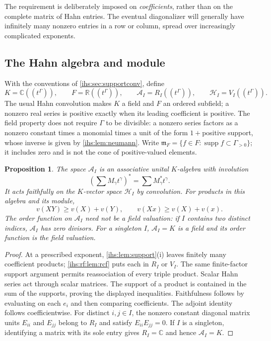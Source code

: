 \documentclass[11pt,a4paper]{article}
\numberwithin{equation}{section}
\newtheorem{proposition}[proposition]{Proposition}
\theoremstyle{definition}
\theoremstyle{remark}
\newcommand{\C}{\mathbb C}
\newcommand{\R}{\mathbb R}
\newcommand{\K}{K}
\newcommand{\Fld}{F}
\newcommand{\mF}{\mathfrak m_F}
\newcommand{\Hrf}{\mathcal H_I}
\newcommand{\Arf}{\mathcal A_I}
\newcommand{\supp}{\operatorname{supp}}
\begin{document}
The requirement is deliberately imposed on \emph{coefficients}, rather than
on the complete matrix of Hahn entries. The eventual diagonalizer will
generally have infinitely many nonzero entries in a row or column, spread
over increasingly complicated exponents.

\subsection{The Hahn algebra and module}\label{ihs:rf:sec:hahnobjects}
With the conventions of \cref{ihs:sec:supportconv}, define
\begin{equation}\label{ihs:rf:eq:spaces}
 \K=\C((t^\Gamma)),\qquad \Fld=\R((t^\Gamma)),\qquad
 \Arf=R_I((t^\Gamma)),\qquad \Hrf=V_I((t^\Gamma)).
\end{equation}
The usual Hahn convolution makes $\K$ a field and $\Fld$ an ordered
subfield; a nonzero real series is positive exactly when its leading
coefficient is positive. The field property does not require $\Gamma$ to be
divisible: a nonzero series factors as a nonzero constant times a monomial
times a unit of the form $1+{}$positive support, whose inverse is given by
\cref{ihs:lem:neumann}. Write
$\mF=\{f\in\Fld:\supp f\subset\Gamma_{>0}\}$; it includes zero and is not
the cone of positive-valued elements.

\begin{proposition}\label{ihs:rf:prop:algebra}
The space $\Arf$ is an associative unital $\K$-algebra with involution
\[
 \left(\sum M_\gamma t^\gamma\right)^*=\sum M_\gamma^*t^\gamma.
\]
It acts faithfully on the $\K$-vector space $\Hrf$ by convolution. For
products in this algebra and its module,
\[
 v(XY)\ge v(X)+v(Y),\qquad v(Xx)\ge v(X)+v(x).
\]
The order function on $\Arf$ need not be a field valuation: if $I$ contains
two distinct indices, $\Arf$ has zero divisors. For a singleton $I$,
$\Arf=\K$ is a field and its order function is the field valuation.
\end{proposition}
\begin{proof}
At a prescribed exponent, \cref{ihs:lem:support}(i) leaves finitely many
coefficient products; \cref{ihs:rf:lem:rcf} puts each in $R_I$ or $V_I$. The
same finite-factor support argument permits reassociation of every triple
product. Scalar Hahn series act through scalar matrices. The support of a
product is contained in the sum of the supports, proving the displayed
inequalities. Faithfulness follows by evaluating on each $e_i$ and then
comparing coefficients. The adjoint identity follows coefficientwise.
For distinct $i,j\in I$, the nonzero constant diagonal matrix units
$E_{ii}$ and $E_{jj}$ belong to $R_I$ and satisfy $E_{ii}E_{jj}=0$.
If $I$ is a singleton, identifying a matrix with its sole entry gives
$R_I=\C$ and hence $\Arf=\K$.
\end{proof}
\end{document}
